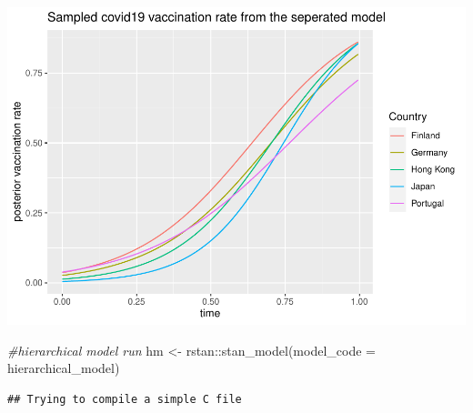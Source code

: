 \documentclass[
]{article}
\newenvironment{Shaded}{\begin{snugshade}}{\end{snugshade}}
\newcommand{\AttributeTok}[1]{\textcolor[rgb]{0.77,0.63,0.00}{#1}}
\newcommand{\CommentTok}[1]{\textcolor[rgb]{0.56,0.35,0.01}{\textit{#1}}}
\newcommand{\FunctionTok}[1]{\textcolor[rgb]{0.00,0.00,0.00}{#1}}
\newcommand{\NormalTok}[1]{#1}
\newcommand{\OtherTok}[1]{\textcolor[rgb]{0.56,0.35,0.01}{#1}}
\newcommand{\SpecialCharTok}[1]{\textcolor[rgb]{0.00,0.00,0.00}{#1}}
\begin{document}
\includegraphics{bda_project_files/figure-latex/unnamed-chunk-15-1.pdf}

\begin{Shaded}
\begin{Highlighting}[]
\CommentTok{\#hierarchical model run}
\NormalTok{hm }\OtherTok{\textless{}{-}}\NormalTok{ rstan}\SpecialCharTok{::}\FunctionTok{stan\_model}\NormalTok{(}\AttributeTok{model\_code =}\NormalTok{ hierarchical\_model)}
\end{Highlighting}
\end{Shaded}

\begin{verbatim}
## Trying to compile a simple C file
\end{verbatim}
\end{document}
